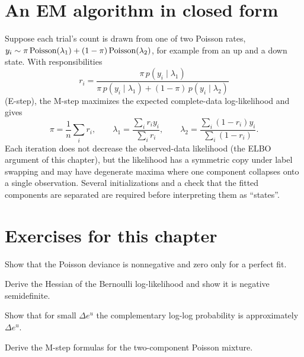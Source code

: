 \section{An EM algorithm in closed form}
Suppose each trial's count is drawn from one of two Poisson rates,
$y_i\sim\pi\operatorname{Poisson}(\lambda_1)+(1-\pi)\operatorname{Poisson}(\lambda_2)$, for example
from an up and a down state. With responsibilities
\[
r_i=\frac{\pi\,p(y_i\mid\lambda_1)}{\pi\,p(y_i\mid\lambda_1)+(1-\pi)\,p(y_i\mid\lambda_2)}
\]
(E-step), the M-step maximizes the expected complete-data log-likelihood
and gives
\[
\pi=\frac1n\sum_ir_i,\qquad\lambda_1=\frac{\sum_ir_iy_i}{\sum_ir_i},\qquad
\lambda_2=\frac{\sum_i(1-r_i)y_i}{\sum_i(1-r_i)}.
\]
Each iteration does not decrease the observed-data likelihood (the ELBO
argument of this chapter), but the likelihood has a symmetric copy under
label swapping and may have degenerate maxima where one component
collapses onto a single observation. Several initializations and a
check that the fitted components are separated are required before
interpreting them as ``states''.

\section*{Exercises for this chapter}
\begin{exercise}
Show that the Poisson deviance is nonnegative and zero only for a
perfect fit.
\end{exercise}
\begin{exercise}
Derive the Hessian of the Bernoulli log-likelihood and show it is
negative semidefinite.
\end{exercise}
\begin{exercise}
Show that for small $\Delta e^{u}$ the complementary log-log
probability is approximately $\Delta e^u$.
\end{exercise}
\begin{exercise}
Derive the M-step formulas for the two-component Poisson mixture.
\end{exercise}
